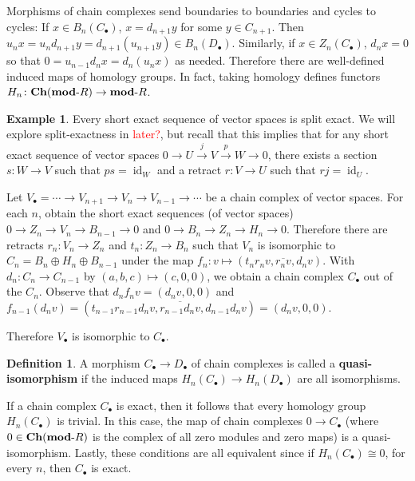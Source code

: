 \documentclass[11pt,leqno]{article}
\newcommand{\sai}[1]{\textcolor{red}{#1}}
\theoremstyle{plain}
\theoremstyle{definition}
\newtheorem{definition/}[lem]{Definition}
\newenvironment{definition}
  {\renewcommand{\qedsymbol}{\textdagger}%
   \pushQED{\qed}\begin{definition/}}
  {\popQED\end{definition/}}
\newtheorem{example}[lem]{Example}
\numberwithin{equation}{section}
\numberwithin{lem}{section}
\newcommand{\bidx}[1]{\textbf{#1\index{#1}}} %
\DeclareMathOperator{\id}{id}
\newcommand{\catname}[1]{{\normalfont\mathbf{#1}}}
\newcommand{\modR}{\catname{mod}\text{-}R}
\newcommand{\Ch}{\catname{Ch}}
\begin{document}
Morphisms of chain complexes send boundaries to boundaries and cycles to cycles: If $x\in B_n(C_\bullet)$, $x = d_{n+1}y$ for some $y\in C_{n+1}$. Then $u_nx = u_nd_{n+1}y = d_{n+1}(u_{n+1}y)\in B_n(D_\bullet)$. Similarly, if $x\in Z_n(C_\bullet)$, $d_nx = 0$ so that $0 = u_{n-1}d_nx = d_n(u_nx)$ as needed. Therefore there are well-defined induced maps of homology groups. In fact, taking homology defines functors $H_n\colon \Ch(\modR)\to \modR$.

\begin{example}
    Every short exact sequence of vector spaces is split exact. We will explore split-exactness in \sai{later?}, but recall that this implies that for any short exact sequence of vector spaces $0\to U\xrightarrow{j}V\xrightarrow{p}W\to 0$, there exists a section $s\colon W\to V$ such that $ps = \id_W$ and a retract $r\colon V\to U$ such that $rj = \id_U$.

    Let $V_\bullet = \cdots\to V_{n+1}\to V_n\to V_{n-1}\to\cdots$ be a chain complex of vector spaces. For each $n$, obtain the short exact sequences (of vector spaces) $0\to Z_n\to V_n\to B_{n-1}\to 0$ and $0\to B_n\to Z_n\to H_n\to 0$. Therefore there are retracts $r_n\colon V_n\to Z_n$ and $t_n\colon Z_n\to B_n$ such that $V_n$ is isomorphic to $C_n = B_n\oplus H_n\oplus B_{n-1}$ under the map $f_n\colon v\mapsto (t_nr_nv, \overline{r_nv}, d_nv)$. With $d_n\colon C_n\to C_{n-1}$ by $(a,b,c)\mapsto (c,0,0)$, we obtain a chain complex $C_\bullet$ out of the $C_n$. Observe that $d_nf_nv = (d_nv, 0, 0)$ and $f_{n-1}(d_nv) = (t_{n-1}r_{n-1}d_nv, \overline{r_{n-1}d_nv}, d_{n-1}d_nv) = (d_nv, 0, 0)$.
    
    Therefore $V_\bullet$ is isomorphic to $C_\bullet$.
\end{example}

\begin{definition}
    A morphism $C_\bullet\to D_\bullet$ of chain complexes is called a \bidx{quasi-isomorphism} if the induced maps  $H_n(C_\bullet)\to H_n(D_\bullet)$ are all isomorphisms.
\end{definition}

If a chain complex $C_\bullet$ is exact, then it follows that every homology group $H_n(C_\bullet)$ is trivial. In this case, the map of chain complexes $0\to C_\bullet$ (where $0\in \Ch(\modR)$ is the complex of all zero modules and zero maps) is a quasi-isomorphism. Lastly, these conditions are all equivalent since if $H_n(C_\bullet)\cong 0$, for every $n$, then $C_\bullet$ is exact.
\end{document}
